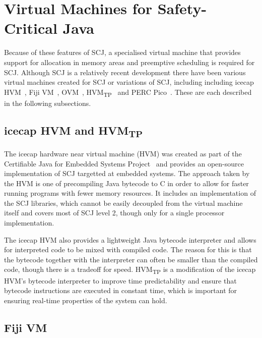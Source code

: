 \documentclass[a4paper,10pt]{report}
\begin{document}
\section{Virtual Machines for Safety-Critical Java}
\label{virtual-machines-section}


Because of these features of SCJ, a specialised virtual machine that provides
support for allocation in memory areas and preemptive scheduling is required for
SCJ. Although SCJ is a relatively recent development there have been various
virtual machines created for SCJ or variations of SCJ, including including
icecap HVM~\cite{sondergaard2012}, Fiji VM~\cite{pizlo2009},
OVM~\cite{armbruster2007}, HVM\textsubscript{TP}~\cite{luckow2014} and PERC
Pico~\cite{atego2015, richard2010}. These are each described in the following
subsections.

\subsection{icecap HVM and HVM\textsubscript{TP}}

The icecap hardware near virtual machine (HVM) was created as part of the
Certifiable Java for Embedded Systems Project~\cite{schoeberl2014} and provides
an open-source implementation of SCJ targetted at embedded systems.  The
approach taken by the HVM is one of precompiling Java bytecode to C in order to
allow for faster running programs with fewer memory resources.  It includes an
implementation of the SCJ libraries, which cannot be easily decoupled from the
virtual machine itself and covers most of SCJ level 2, though only for a single
processor implementation.

The icecap HVM also provides a lightweight Java bytecode interpreter and allows
for interpreted code to be mixed with compiled code.  The reason for this is
that the bytecode together with the interpreter can often be smaller than the
compiled code, though there is a tradeoff for speed. HVM\textsubscript{TP} is a
modification of the icecap HVM's bytecode interpreter to improve time
predictability and ensure that bytecode instructions are executed in constant
time, which is important for ensuring real-time properties of the system can
hold.

\subsection{Fiji VM}
\end{document}
